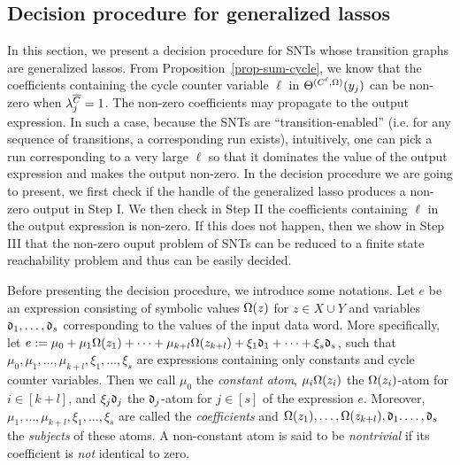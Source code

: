 

\subsection{Decision procedure for generalized lassos}\label{sec-glasso}

%
In this section, we present a decision procedure for SNTs whose transition graphs are generalized lassos. From Proposition~\ref{prop-sum-cycle}, we know that the coefficients containing the cycle counter variable $\ell$ in $\Theta^{(C^\ell,\Omega)}(y_j)$ can be non-zero when $\lambda^{\overline{C}}_{j}=1$. The non-zero coefficients may propagate to the output expression.  In such a case, 
because the SNTs are ``transition-enabled'' (i.e. for any sequence of transitions, a corresponding run exists), %
intuitively, one can pick a run corresponding to a very large $\ell$ so that it dominates the value of the output expression and makes the output non-zero. 
In the decision procedure we are going to present, we first check if the handle of the generalized lasso produces a non-zero output in Step I.
We then check in Step II the coefficients containing $\ell$ in the output expression is non-zero. If this does not happen, then we show in Step III that the non-zero ouput problem of SNTs can be reduced to a finite state reachability problem and thus can be easily decided.

Before presenting the decision procedure, we introduce some notations.
Let $e$ be an expression consisting of symbolic values $\Omega(z)$ for $z\in X\cup Y$ and variables $\mathfrak{d}_1, \dots, \mathfrak{d}_{s}$ corresponding to the values of the input data word. More specifically, let $e:=\mu_0 + \mu_1 \Omega(z_1) +\dots + \mu_{k+l} \Omega(z_{k+l}) + \xi_1 \mathfrak{d}_1 + \dots + \xi_{s} \mathfrak{d}_{s}$,
such that $\mu_0,\mu_1,\dots,\mu_{k+l}, \xi_1,\dots,\xi_{s}$ are expressions containing only constants and cycle counter variables.
Then we call $\mu_0$ the \emph{constant atom}, $\mu_i \Omega(z_i)$ the $\Omega(z_i)$-atom for $i\in[k+l]$, and $\xi_j \mathfrak{d}_j$ the $\mathfrak{d}_j$-atom for $j\in[s]$ of the expression $e$. Moreover, $\mu_1, \dots, \mu_{k+l}, \xi_1,\dots, \xi_{s}$ are called the \emph{coefficients} and $\Omega(z_1), \dots, \Omega(z_{k+l}), \mathfrak{d}_1. \dots, \mathfrak{d}_{s}$ the \emph{subjects} of these atoms.
A non-constant atom is said to be \emph{nontrivial} if its coefficient is \emph{not} identical to zero.


